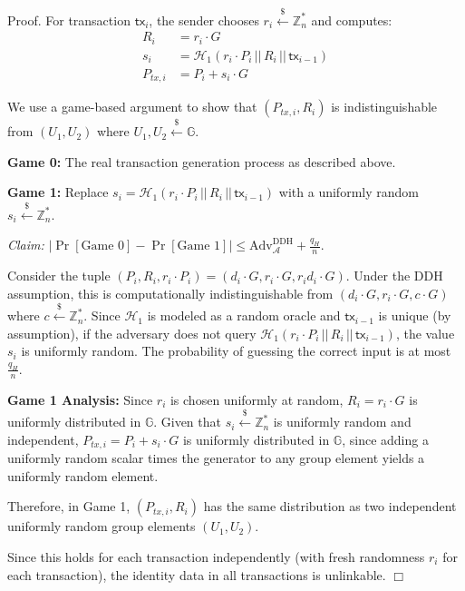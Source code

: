 \documentclass{article}
\newenvironment{proof}{\textsf{Proof}.}{\hfill$\Box$}
\begin{document}
\begin{proof}
For transaction $\mathsf{tx}_i$, the sender chooses $r_i \stackrel{\$}{\leftarrow} \mathbb{Z}_n^*$ and computes:
\begin{align*}
R_i &= r_i \cdot G \\
s_i &= \mathcal{H}_1(r_i \cdot P_i \,||\, R_i \,||\, \mathsf{tx}_{i-1}) \\
P_{tx,i} &= P_i + s_i \cdot G
\end{align*}

We use a game-based argument to show that $(P_{tx,i}, R_i)$ is indistinguishable from $(U_1, U_2)$ where $U_1, U_2 \stackrel{\$}{\leftarrow} \mathbb{G}$.

\textbf{Game 0:} The real transaction generation process as described above.

\textbf{Game 1:} Replace $s_i = \mathcal{H}_1(r_i \cdot P_i \,||\, R_i \,||\, \mathsf{tx}_{i-1})$ with a uniformly random $s_i \stackrel{\$}{\leftarrow} \mathbb{Z}_n^*$.

\noindent\textit{Claim:} $|\Pr[\text{Game 0}] - \Pr[\text{Game 1}]| \leq \text{Adv}^{\text{DDH}}_{\mathcal{A}} + \frac{q_H}{n}$.

Consider the tuple $(P_i, R_i, r_i \cdot P_i) = (d_i \cdot G, r_i \cdot G, r_i d_i \cdot G)$. Under the DDH assumption, this is computationally indistinguishable from $(d_i \cdot G, r_i \cdot G, c \cdot G)$ where $c \stackrel{\$}{\leftarrow} \mathbb{Z}_n^*$. Since $\mathcal{H}_1$ is modeled as a random oracle and $\mathsf{tx}_{i-1}$ is unique (by assumption), if the adversary does not query $\mathcal{H}_1(r_i \cdot P_i \,||\, R_i \,||\, \mathsf{tx}_{i-1})$, the value $s_i$ is uniformly random. The probability of guessing the correct input is at most $\frac{q_H}{n}$.

\textbf{Game 1 Analysis:} Since $r_i$ is chosen uniformly at random, $R_i = r_i \cdot G$ is uniformly distributed in $\mathbb{G}$. Given that $s_i \stackrel{\$}{\leftarrow} \mathbb{Z}_n^*$ is uniformly random and independent, $P_{tx,i} = P_i + s_i \cdot G$ is uniformly distributed in $\mathbb{G}$, since adding a uniformly random scalar times the generator to any group element yields a uniformly random element.

Therefore, in Game 1, $(P_{tx,i}, R_i)$ has the same distribution as two independent uniformly random group elements $(U_1, U_2)$.

Since this holds for each transaction independently (with fresh randomness $r_i$ for each transaction), the identity data in all transactions is unlinkable.
\end{proof}
\end{document}
